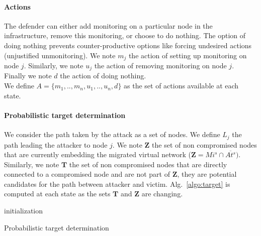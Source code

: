 \paragraph{Actions}
\label{sec:actionset}
The defender can either add monitoring on a particular node in the infrastructure, remove this monitoring, or choose to do nothing.
The option of doing nothing prevents counter-productive options like forcing undesired actions (\eg unjustified unmonitoring).
We note $m_j$ the action of setting up monitoring on node $j$. Similarly, we note $u_j$ the action of removing monitoring on node $j$.
Finally we note $d$ the action of doing nothing.
\\We define $A = \{m_1,..,m_n,u_1,..,u_n,d\}$ as the set of actions available at each state.


\paragraph{Probabilistic target determination}
\label{sec:target_proba}
We consider the path taken by the attack as a set of nodes.
We define $L_j$ the path leading the attacker to node $j$.
We note $\textbf{Z}$ the set of non compromised nodes that are currently embedding the migrated virtual network (\ie $\textbf{Z} = Mi^s \cap \overline{At^s})$.
Similarly, we note $\textbf{T}$ the set of non compromised nodes that are directly connected to a compromised node and are not part of $\textbf{Z}$, \ie they are potential candidates for the path between attacker and victim. Alg.~\ref{algo:target} is computed at each state as the sets $\textbf{T}$ and $\textbf{Z}$ are changing.
\begin{algorithm}
 initialization\;
 \caption{Probabilistic target determination}
 \label{algo:target}
\end{algorithm}


